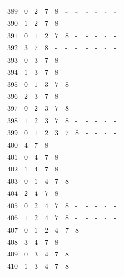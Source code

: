 \begin{appendices}
\begin{table}[H]
\begin{tabular} {|l|l|l|l|l|l|l|l|l|l|l|}
  		$ 389 $ & $ 0 $ &$ 2 $ &$ 7 $ &$ 8 $ & - &  - &  - &  - &  - &  -   \\ \hline
  		$ 390 $ & $ 1 $ &$ 2 $ &$ 7 $ &$ 8 $ & - &  - &  - &  - &  - &  -   \\ \hline
  		$ 391 $ & $ 0 $ &$ 1 $ &$ 2 $ &$ 7 $ &$ 8 $ & - &  - &  - &  - &  -   \\ \hline
  		$ 392 $ & $ 3 $ &$ 7 $ &$ 8 $ & - &  - &  - &  - &  - &  - &  -   \\ \hline
  		$ 393 $ & $ 0 $ &$ 3 $ &$ 7 $ &$ 8 $ & - &  - &  - &  - &  - &  -   \\ \hline
  		$ 394 $ & $ 1 $ &$ 3 $ &$ 7 $ &$ 8 $ & - &  - &  - &  - &  - &  -   \\ \hline
  		$ 395 $ & $ 0 $ &$ 1 $ &$ 3 $ &$ 7 $ &$ 8 $ & - &  - &  - &  - &  -   \\ \hline
  		$ 396 $ & $ 2 $ &$ 3 $ &$ 7 $ &$ 8 $ & - &  - &  - &  - &  - &  -   \\ \hline
  		$ 397 $ & $ 0 $ &$ 2 $ &$ 3 $ &$ 7 $ &$ 8 $ & - &  - &  - &  - &  -   \\ \hline
  		$ 398 $ & $ 1 $ &$ 2 $ &$ 3 $ &$ 7 $ &$ 8 $ & - &  - &  - &  - &  -   \\ \hline
  		$ 399 $ & $ 0 $ &$ 1 $ &$ 2 $ &$ 3 $ &$ 7 $ &$ 8 $ & - &  - &  - &  -   \\ \hline
  		$ 400 $ & $ 4 $ &$ 7 $ &$ 8 $ & - &  - &  - &  - &  - &  - &  -   \\ \hline
  		$ 401 $ & $ 0 $ &$ 4 $ &$ 7 $ &$ 8 $ & - &  - &  - &  - &  - &  -   \\ \hline
  		$ 402 $ & $ 1 $ &$ 4 $ &$ 7 $ &$ 8 $ & - &  - &  - &  - &  - &  -   \\ \hline
  		$ 403 $ & $ 0 $ &$ 1 $ &$ 4 $ &$ 7 $ &$ 8 $ & - &  - &  - &  - &  -   \\ \hline
  		$ 404 $ & $ 2 $ &$ 4 $ &$ 7 $ &$ 8 $ & - &  - &  - &  - &  - &  -   \\ \hline
  		$ 405 $ & $ 0 $ &$ 2 $ &$ 4 $ &$ 7 $ &$ 8 $ & - &  - &  - &  - &  -   \\ \hline
  		$ 406 $ & $ 1 $ &$ 2 $ &$ 4 $ &$ 7 $ &$ 8 $ & - &  - &  - &  - &  -   \\ \hline
  		$ 407 $ & $ 0 $ &$ 1 $ &$ 2 $ &$ 4 $ &$ 7 $ &$ 8 $ & - &  - &  - &  -   \\ \hline
  		$ 408 $ & $ 3 $ &$ 4 $ &$ 7 $ &$ 8 $ & - &  - &  - &  - &  - &  -   \\ \hline
  		$ 409 $ & $ 0 $ &$ 3 $ &$ 4 $ &$ 7 $ &$ 8 $ & - &  - &  - &  - &  -   \\ \hline
  		$ 410 $ & $ 1 $ &$ 3 $ &$ 4 $ &$ 7 $ &$ 8 $ & - &  - &  - &  - &  -   \\ \hline

\end{tabular}
\end{table}
\end{appendices}
